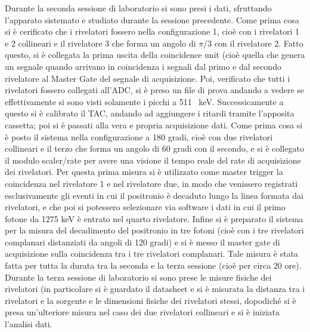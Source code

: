 Durante la seconda sessione di laboratorio si sono presi i dati, sfruttando l'apparato sistemato e studiato durante la sessione precedente. Come prima cosa si è
cerificato che i rivelatori fossero nella configurazione 1, cioè con i rivelatori 1 e 2 collineari e il rivelatore 3 che forma un angolo di $\pi/3$ con il
rivelatore 2. Fatto questo, si è collegata la prima uscita della coincidence unit (cioè quella che genera un segnale quando arrivano in coincidenza i segnali
dal primo e dal secondo rivelatore al Master Gate del segnale di acquisizione. Poi, verificato che tutti i rivelatori fossero collegati all'ADC, si
è preso un file di prova andando a vedere se effettivamente si sono visti solamente i picchi a 511 ~keV. Successicamente a questo si è calibrato il TAC, andando ad aggiungere
i ritardi tramite l'apposita cassetta; poi si è passati alla vera e propria acquisizione dati. Come prima cosa si è posto il sistema nella configurazione a 180 gradi,
cioè con due rivelatori collineari e il terzo che forma un angolo di 60 gradi con il secondo, e si è collegato il modulo scaler/rate per avere una visione il tempo
reale del rate di acquisizione dei rivelatori. Per questa prima misura si è utilizzato come master trigger la coincidenza nel rivelatore 1 e nel rivelatore due, in modo
che venissero registrati esclusivamente gli eventi in cui il positronio è decaduto lungo la linea formata dai rivelatori, e che poi si potessero selezionare via software
i dati in cui il primo fotone da 1275 keV è entrato nel quarto rivelatore. Infine si è preparato il sistema per la misura del decadimento del positronio in tre fotoni (cioè
con i tre rivelatori complanari distanziati da angoli di 120 gradi) e si è messo il master gate di acquisizione sulla coincidenza tra i tre rivelatori complanari. Tale
misura è stata fatta per tutta la durata tra la seconda e la terza sessione (cioè per circa 20 ore).\\

Durante la terza sessione di laboratorio si sono prese le misure fisiche dei rivelatori (in particolare si è guardato il datasheet e si è misurata la distanza tra
i rivelatori e la sorgente e le dimensioni fisiche dei rivelatori stessi, dopodiché si è presa un'ulteriore misura nel caso dei due rivelatori collineari e si è iniziata
l'analisi dati. 

